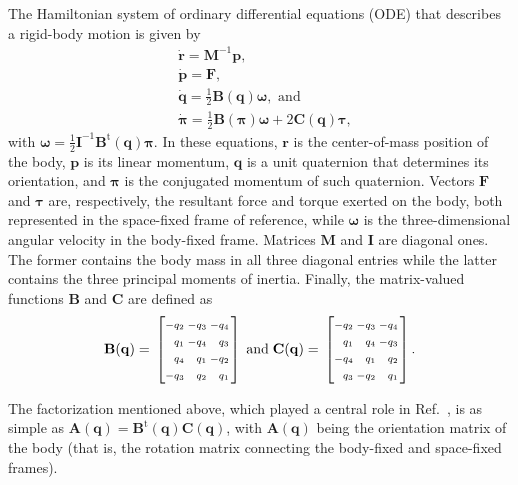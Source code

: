 \documentclass[
journal=jctcce,
layout=twocolumn
]{achemso}
\makeatletter
\newcommand{\mt}[1]{\boldsymbol{\mathbf{#1}}}   %
\newcommand{\vt}[1]{\boldsymbol{\mathbf{#1}}}   %
\newcommand{\tr}[1]{#1^\text{t}}                %
\newcommand{\diff}[2]{\frac{\partial #1}{\partial #2}} %
\newcommand{\Ham}[1]{{\mathcal H}_\text{#1}}    %
\newenvironment{smallarray}[1]                          %
{\null\,\vcenter\bgroup\scriptsize
	\renewcommand{\arraystretch}{1.5}
	\arraycolsep=.13885em
	\hbox\bgroup$\left[\array{@{}#1@{}}}
{\endarray\right]$\egroup\egroup\,\null}
\makeatother
\begin{document}
The Hamiltonian system of ordinary differential equations (ODE) that describes a rigid-body motion is given by \cite{Silveira_2017}
\begin{subequations}
	\label{eq:ODE system for NVE}
	\begin{align}
%
	&\dot{\vt r} =
	{\mt M}^{-1} {\vt p}, \\
%
	&\dot{\vt p} =
	{\vt F}, \\
%
	&\dot{\vt q} =
	\frac{1}{2} \mt B(\vt q) \vt \omega, \text{ and} \label{eq:EDO_q} \\
%
	&\dot{\vt \pi} =
	\frac{1}{2} \mt B(\vt \pi) \vt \omega + 2 \mt C(\vt q) \vt \tau, \label{eq:EDO_pi}
	\end{align}
\end{subequations}
with $\vt \omega = \frac{1}{2} {\mt I}^{-1} \tr{\mt B}(\vt q) {\vt \pi}$.
In these equations, $\vt r$ is the center-of-mass position of the body, $\vt p$ is its linear momentum, $\vt q$ is a unit quaternion that determines its orientation, and $\vt \pi$ is the conjugated momentum of such quaternion.
Vectors $\vt F$ and $\vt \tau$ are, respectively, the resultant force and torque exerted on the body, both represented in the space-fixed frame of reference, while $\vt \omega$ is the three-dimensional angular velocity in the body-fixed frame.
Matrices $\mt M$ and $\mt I$ are diagonal ones.
The former contains the body mass in all three diagonal entries while the latter contains the three principal moments of inertia.
Finally, the matrix-valued functions $\mt B$ and $\vt C$ are defined as
\begin{equation*}
\label{eq:def_B_and_C}
\mt B(\vt q) = \begin{smallarray}{rrrr}
-q_2 & -q_3 & -q_4 \\
 q_1 & -q_4 &  q_3 \\
 q_4 &  q_1 & -q_2 \\
-q_3 &  q_2 &  q_1
\end{smallarray}
%
\; \text{and} \;
%
\mt C(\vt q) = \begin{smallarray}{rrrr}
-q_2 & -q_3 & -q_4 \\
 q_1 &  q_4 & -q_3 \\
-q_4 &  q_1 &  q_2 \\
 q_3 & -q_2 &  q_1
\end{smallarray}.
\end{equation*}

The factorization mentioned above, which played a central role in Ref.~, is as simple as ${\mt A}(\vt q) = \tr{\mt B}(\vt q) {\mt C}(\vt q)$, with ${\mt A}(\vt q)$ being the orientation matrix of the body (that is, the rotation matrix connecting the body-fixed and space-fixed frames).
\end{document}
